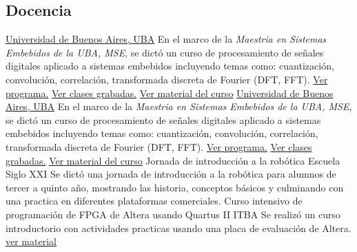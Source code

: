       \vfill{}

   \subsection{\bfseries{Docencia}}
                   {\href{\linkuba}{Universidad de Buenos Aires, UBA}} {}{}{En el marco de la \emph{Maestria en Sistemas Embebidos de la UBA, MSE}, se dictó un curso de procesamiento de señales digitales  aplicado a sistemas embebidos incluyendo temas como: cuantización, convolución, correlación, transformada discreta de Fourier (DFT, FFT). \href{\linkmse}{Ver programa.} \href{\linkmsepsftwentyonevideos}{Ver clases grabadas.} \href{\linkmsepsftwentyonematerial}{Ver material del curso}}
                                  {\href{\linkuba}{Universidad de Buenos Aires, UBA}} {}{}{En el marco de la \emph{Maestria en Sistemas Embebidos de la UBA, MSE}, se dictó un curso de procesamiento de señales digitales  aplicado a sistemas embebidos incluyendo temas como: cuantización, convolución, correlación, transformada discreta de Fourier (DFT, FFT). \href{\linkmse}{Ver programa.} \href{\linkmsepsfvideos}{Ver clases grabadas.} \href{\linkmsepsfmaterial}{Ver material del curso}}
       { Jornada de introducción a la robótica}                               { Escuela Siglo XXI} { } { } { Se dictó una jornada de introducción a la robótica para alumnos de tercer a quinto año, mostrando las historia, conceptos básicos y culminando con una practica en diferentes plataformas comerciales.}                     { }
       { Curso intensivo de programación de FPGA de Altera usando Quartus II} { ITBA}      { } { } { Se realizó un curso introductorio con actividades practicas usando una placa de evaluación de Altera. \href { \linkfpgasig } { ver material}}
      \vfill{}

